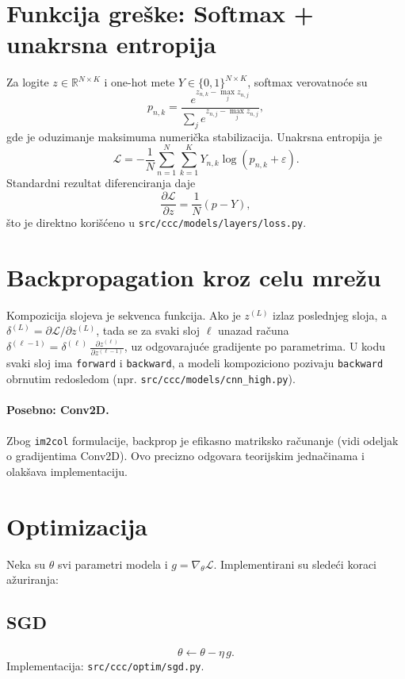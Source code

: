 \documentclass[11pt,a4paper]{article}
\begin{document}
\section{Funkcija greške: Softmax + unakrsna entropija}
Za logite $z\in\mathbb{R}^{N\times K}$ i one-hot mete $Y\in\{0,1\}^{N\times K}$, softmax verovatnoće su
\begin{equation}
 p_{n,k} = \frac{e^{z_{n,k}-\max_j z_{n,j}}}{\sum_j e^{z_{n,j}-\max_j z_{n,j}}},
\end{equation}
gde je oduzimanje maksimuma numerička stabilizacija. Unakrsna entropija je
\begin{equation}
 \mathcal{L} = -\frac{1}{N} \sum_{n=1}^N \sum_{k=1}^K Y_{n,k} \log(p_{n,k}+\varepsilon).
\end{equation}
Standardni rezultat diferenciranja daje
\begin{equation}
 \frac{\partial \mathcal{L}}{\partial z} = \frac{1}{N}(p - Y),
\end{equation}
što je direktno korišćeno u \texttt{src/ccc/models/layers/loss.py}.

\section{Backpropagation kroz celu mrežu}
Kompozicija slojeva je sekvenca funkcija. Ako je $z^{(L)}$ izlaz poslednjeg sloja, a $\delta^{(L)}=\partial \mathcal{L}/\partial z^{(L)}$, tada se za svaki sloj $\ell$ unazad računa $\delta^{(\ell-1)} = \delta^{(\ell)}\,\frac{\partial z^{(\ell)}}{\partial z^{(\ell-1)}}$, uz odgovarajuće gradijente po parametrima. U kodu svaki sloj ima \texttt{forward} i \texttt{backward}, a modeli kompoziciono pozivaju \texttt{backward} obrnutim redosledom (npr. \texttt{src/ccc/models/cnn\_high.py}).

\paragraph{Posebno: Conv2D.} Zbog \texttt{im2col} formulacije, backprop je efikasno matriksko računanje (vidi odeljak o gradijentima Conv2D). Ovo precizno odgovara teorijskim jednačinama i olakšava implementaciju.

\section{Optimizacija}
Neka su $\theta$ svi parametri modela i $g=\nabla_{\theta}\mathcal{L}$. Implementirani su sledeći koraci ažuriranja:
\subsection{SGD}\vspace{-6pt}
\begin{equation}
 \theta \leftarrow \theta - \eta\, g.
\end{equation}
Implementacija: \texttt{src/ccc/optim/sgd.py}.
\end{document}
